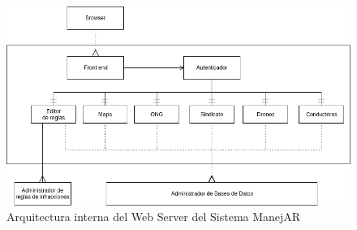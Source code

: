 \begin{figure}
\centerline{\includegraphics[width=1\textwidth]{./imagenes/arquitectura_tp2/web_server.png}}
\caption{Arquitectura interna del Web Server del Sistema ManejAR}
\end{figure}
